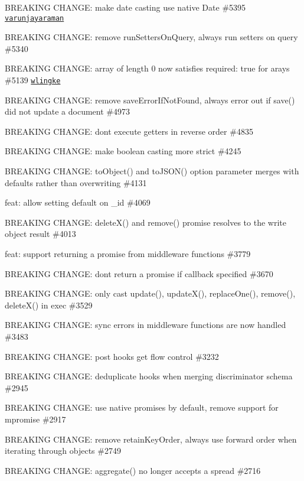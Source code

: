\begin{DoxyItemize}
\item B\+R\+E\+A\+K\+I\+NG C\+H\+A\+N\+GE\+: make date casting use native Date \#5395 \href{https://github.com/varunjayaraman}{\tt varunjayaraman}
\item B\+R\+E\+A\+K\+I\+NG C\+H\+A\+N\+GE\+: remove {\ttfamily run\+Setters\+On\+Query}, always run setters on query \#5340
\item B\+R\+E\+A\+K\+I\+NG C\+H\+A\+N\+GE\+: array of length 0 now satisfies {\ttfamily required\+: true} for arays \#5139 \href{https://github.com/wlingke}{\tt wlingke}
\item B\+R\+E\+A\+K\+I\+NG C\+H\+A\+N\+GE\+: remove {\ttfamily save\+Error\+If\+Not\+Found}, always error out if {\ttfamily save()} did not update a document \#4973
\item B\+R\+E\+A\+K\+I\+NG C\+H\+A\+N\+GE\+: don\textquotesingle{}t execute getters in reverse order \#4835
\item B\+R\+E\+A\+K\+I\+NG C\+H\+A\+N\+GE\+: make boolean casting more strict \#4245
\item B\+R\+E\+A\+K\+I\+NG C\+H\+A\+N\+GE\+: {\ttfamily to\+Object()} and {\ttfamily to\+J\+S\+O\+N()} option parameter merges with defaults rather than overwriting \#4131
\item feat\+: allow setting {\ttfamily default} on {\ttfamily \+\_\+id} \#4069
\item B\+R\+E\+A\+K\+I\+NG C\+H\+A\+N\+GE\+: {\ttfamily delete\+X()} and {\ttfamily remove()} promise resolves to the write object result \#4013
\item feat\+: support returning a promise from middleware functions \#3779
\item B\+R\+E\+A\+K\+I\+NG C\+H\+A\+N\+GE\+: don\textquotesingle{}t return a promise if callback specified \#3670
\item B\+R\+E\+A\+K\+I\+NG C\+H\+A\+N\+GE\+: only cast {\ttfamily update()}, {\ttfamily update\+X()}, {\ttfamily replace\+One()}, {\ttfamily remove()}, {\ttfamily delete\+X()} in exec \#3529
\item B\+R\+E\+A\+K\+I\+NG C\+H\+A\+N\+GE\+: sync errors in middleware functions are now handled \#3483
\item B\+R\+E\+A\+K\+I\+NG C\+H\+A\+N\+GE\+: post hooks get flow control \#3232
\item B\+R\+E\+A\+K\+I\+NG C\+H\+A\+N\+GE\+: deduplicate hooks when merging discriminator schema \#2945
\item B\+R\+E\+A\+K\+I\+NG C\+H\+A\+N\+GE\+: use native promises by default, remove support for mpromise \#2917
\item B\+R\+E\+A\+K\+I\+NG C\+H\+A\+N\+GE\+: remove {\ttfamily retain\+Key\+Order}, always use forward order when iterating through objects \#2749
\item B\+R\+E\+A\+K\+I\+NG C\+H\+A\+N\+GE\+: {\ttfamily aggregate()} no longer accepts a spread \#2716
\end{DoxyItemize}

